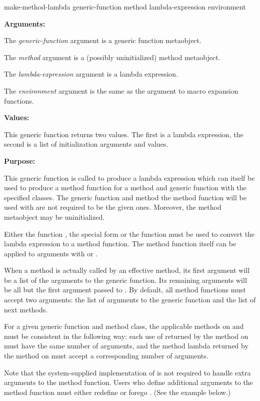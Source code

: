 \begin{defun}
make-method-lambda generic-function method lambda-expression environment

\textbf{Arguments:}

The \emph{generic-function} argument is a generic function metaobject.

The \emph{method} argument is a (possibly uninitialized) method metaobject.

The \emph{lambda-expression} argument is a lambda expression.

The \emph{environment} argument is the same as the  argument
to macro expansion functions.

\textbf{Values:}

This generic function returns two values. The first is a lambda expression, the
second is a list of initialization arguments and values.

\textbf{Purpose:}

This generic function is called to produce a lambda expression which can itself
be used to produce a method function for a method and generic function with the
specified classes. The generic function and method the method function will be
used with are not required to be the given ones. Moreover, the method metaobject
may be uninitialized.

Either the function , the special form  or the
function  must be used to convert the lambda expression to a method
function. The method function itself can be applied to arguments with  or
.

When a method is actually called by an effective method, its first argument will
be a list of the arguments to the generic function. Its remaining arguments will
be all but the first argument passed to . By default, all
method functions must accept two arguments: the list of arguments to the generic
function and the list of next methods.

For a given generic function and method class, the applicable methods on
 and  must be consistent
in the following way: each use of  returned by the method on
 must have the same number of arguments, and the
method lambda returned by the method on  must accept a
corresponding number of arguments.

Note that the system-supplied implementation of  is not
required to handle extra arguments to the method function. Users who define
additional arguments to the method function must either redefine or forego
. (See the example below.)


\end{defun}
